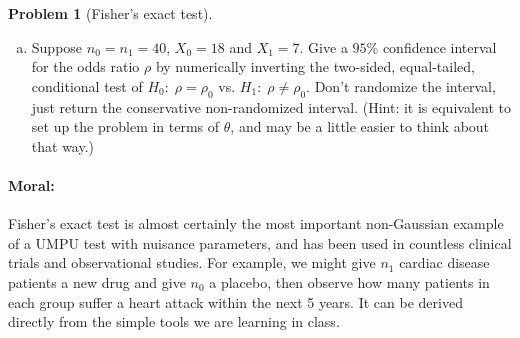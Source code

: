 \documentclass{article}
\theoremstyle{definition}
\newtheorem{problem}{Problem}
\begin{document}
\begin{problem}[Fisher's exact test]
\begin{enumerate}[(a)]
\item Suppose $n_0=n_1=40$, $X_0=18$ and $X_1=7$. Give a $95\%$ confidence interval for the odds ratio $\rho$ by numerically inverting the two-sided,
equal-tailed, conditional test of $H_0:\; \rho=\rho_0$ vs. $H_1:\; \rho \neq \rho_0$. Don't randomize the interval, just return the conservative non-randomized interval. (Hint: it is equivalent to set up the problem in terms of $\theta$, and may be a little easier to think about that way.)


\end{enumerate}

\paragraph{Moral:} Fisher's exact test is almost certainly the most important non-Gaussian example of a UMPU test with nuisance parameters, and has been used in countless clinical trials and observational studies. For example, we might give $n_1$ cardiac disease patients a new drug and give $n_0$ a placebo, then observe how many patients in each group suffer a heart attack within the next 5 years. It can be derived directly from the simple tools we are learning in class.
\end{problem}
\end{document}
